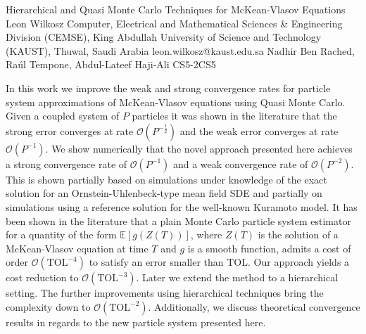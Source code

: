 \begin{talk}
  {Hierarchical and Quasi Monte Carlo
Techniques for McKean-Vlasov Equations}%
  {Leon Wilkosz}%
  {Computer, Electrical and Mathematical Sciences \& Engineering Division (CEMSE), King Abdullah
University of Science and Technology (KAUST), Thuwal, Saudi Arabia}%
  {leon.wilkosz@kaust.edu.sa}%
  {Nadhir Ben Rached, Raúl Tempone, Abdul-Lateef Haji-Ali}%
{}{}{CS5-2}{CS5}


				
				

In this work we improve the weak and strong convergence rates for particle system approximations of McKean-Vlasov equations using Quasi Monte Carlo. Given a coupled system of $P$ particles it was shown in the literature that the strong error converges at rate $\mathcal{O}(P^{-\frac{1}{2}})$ and the weak error converges at rate $\mathcal{O}(P^{-1})$. We show numerically that the novel approach presented here achieves a strong convergence rate of $\mathcal{O}(P^{-1})$ and a weak convergence rate of $\mathcal{O}(P^{-2})$. This is shown partially based on simulations under knowledge of the exact solution for an Ornstein-Uhlenbeck-type mean field SDE and partially on simulations using a reference solution for the well-known Kuramoto model. It has been shown in the literature that a plain Monte Carlo particle system estimator for a quantity of the form $\mathbb{E}[g(Z(T))]$, where $Z(T)$ is the solution of a McKean-Vlasov equation at time $T$ and $g$ is a smooth function, admits a cost of order $\mathcal{O}(\text{TOL}^{-4})$ to satisfy an error smaller than $\text{TOL}$. Our approach yields a cost reduction to $\mathcal{O}(\text{TOL}^{-3})$. Later we extend the method to a hierarchical setting. The further improvements using hierarchical techniques bring the complexity down to $\mathcal{O}(\text{TOL}^{-2})$. Additionally, we discuss theoretical convergence results in regards to the new particle system presented here.
\end{talk}

